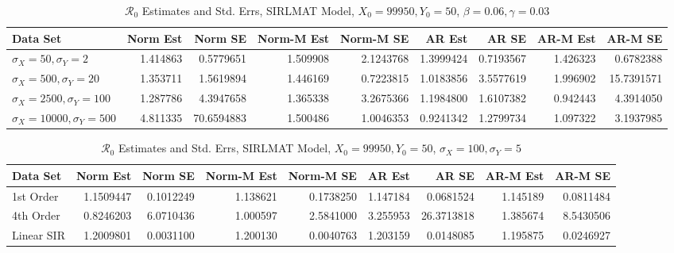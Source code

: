 \message{ !name(draft_v13.tex)}\documentclass[12pt]{article}
\newcommand{\rr}{\ensuremath{\mathcal{R}_0}}
\begin{document}
\begin{table}[H]
	
	\caption{\label{tab:}$\rr$ Estimates and Std. Errs, SIRLMAT Model,
		$X_0 = 99950, Y_0 = 50$, $\beta = 0.06, \gamma = 0.03$}
	\centering
	\begin{footnotesize}
		\begin{tabular}[t]{l|r|r|r|r|r|r|r|r}
			\hline
			Data Set & Norm Est & Norm SE & Norm-M Est & Norm-M SE & AR Est & AR SE & AR-M Est & AR-M SE\\
			\hline
			$\sigma_X = 50, \sigma_Y = 2$ & 1.414863 & 0.5779651 & 1.509908 & 2.1243768 & 1.3999424 & 0.7193567 & 1.426323 & 0.6782388\\
			\hline
			$\sigma_X = 500, \sigma_Y = 20$ & 1.353711 & 1.5619894 & 1.446169 & 0.7223815 & 1.0183856 & 3.5577619 & 1.996902 & 15.7391571\\
			\hline
			$\sigma_X = 2500, \sigma_Y = 100$ & 1.287786 & 4.3947658 & 1.365338 & 3.2675366 & 1.1984800 & 1.6107382 & 0.942443 & 4.3914050\\
			\hline
			$\sigma_X = 10000, \sigma_Y = 500$ & 4.811335 & 70.6594883 & 1.500486 & 1.0046353 & 0.9241342 & 1.2799734 & 1.097322 & 3.1937985\\
			\hline
		\end{tabular}
	\end{footnotesize}
\end{table}

\begin{table}[H]
	
	\caption{\label{tab:}$\rr$ Estimates and Std. Errs, SIRLMAT Model,
		$X_0 = 99950, Y_0 = 50$, $\sigma_X = 100, \sigma_Y = 5$}
	\centering
	\begin{footnotesize}
		\begin{tabular}[t]{l|r|r|r|r|r|r|r|r}
			\hline
			Data Set & Norm Est & Norm SE & Norm-M Est & Norm-M SE & AR Est & AR SE & AR-M Est & AR-M SE\\
			\hline
			1st Order & 1.1509447 & 0.1012249 & 1.138621 & 0.1738250 & 1.147184 & 0.0681524 & 1.145189 & 0.0811484\\
			\hline
			4th Order & 0.8246203 & 6.0710436 & 1.000597 & 2.5841000 & 3.255953 & 26.3713818 & 1.385674 & 8.5430506\\
			\hline
			Linear SIR & 1.2009801 & 0.0031100 & 1.200130 & 0.0040763 & 1.203159 & 0.0148085 & 1.195875 & 0.0246927\\
			\hline
		\end{tabular}
	\end{footnotesize}
\end{table}
\end{document}
